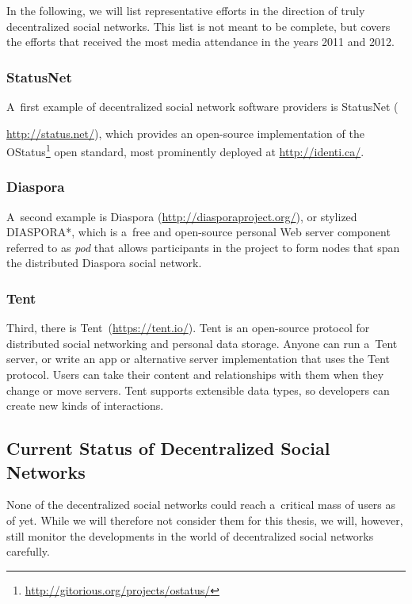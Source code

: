 In the following, we will list representative efforts 
in the direction of truly decentralized social networks.
This list is not meant to be complete,
but covers the efforts that received the most media attendance
in the years 2011 and 2012.

\subsubsection{StatusNet}

A~first example of decentralized social network software providers
is StatusNet ({\url{http://status.net/}),
which provides an open-source implementation of the
OStatus\footnote{\url{http://gitorious.org/projects/ostatus/}}
open standard, most prominently deployed
at \url{http://identi.ca/}.

\subsubsection{Diaspora}

A~second example is Diaspora (\url{http://diasporaproject.org/}),
or stylized DIASPORA*,
which is a~free and open-source personal Web server component
referred to as \emph{pod} that allows
participants in the project to form nodes
that span the distributed Diaspora social network.

\subsubsection{Tent}

Third, there is Tent\texttrademark~(\url{https://tent.io/}).
Tent is an open-source protocol for distributed social networking
and personal data storage.
Anyone can run a~Tent server,
or write an app or alternative server implementation
that uses the Tent protocol.
Users can take their content and relationships with them
when they change or move servers.
Tent supports extensible data types,
so developers can create new kinds of interactions.

\subsection{Current Status of Decentralized Social Networks}

None of the decentralized social networks could reach
a~critical mass of users as of yet.
While we will therefore not consider them for this thesis,
we will, however, still monitor the developments in the world
of decentralized social networks carefully.

}
